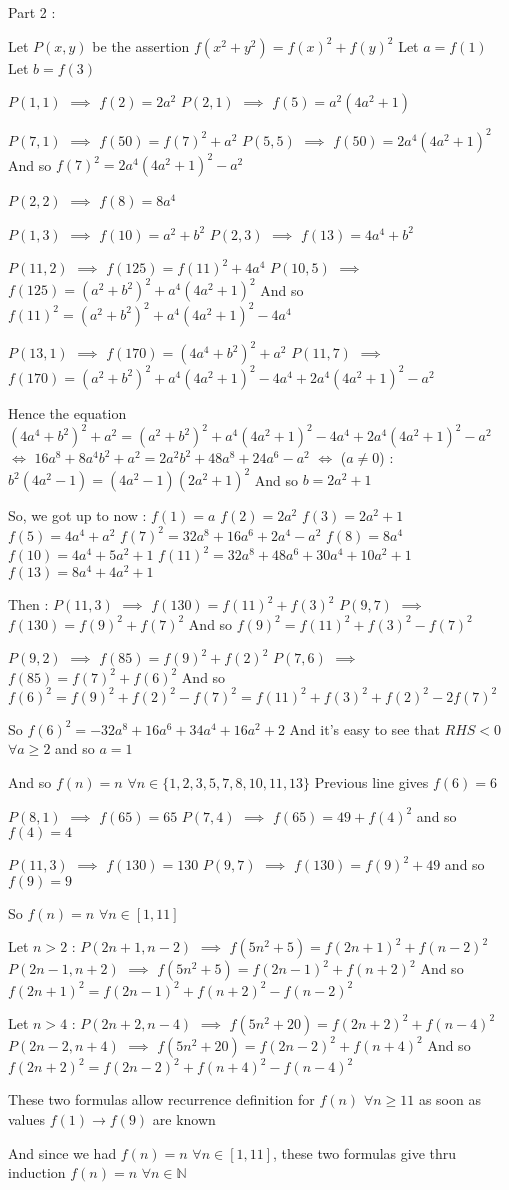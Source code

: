 \begin{solution}
	Part 2 :

Let $P(x,y)$ be the assertion $f(x^2+y^2)=f(x)^2+f(y)^2$
Let $a=f(1)$
Let $b=f(3)$

$P(1,1)$ $\implies$ $f(2)=2a^2$
$P(2,1)$ $\implies$ $f(5)=a^2(4a^2+1)$

$P(7,1)$ $\implies$ $f(50)=f(7)^2+a^2$
$P(5,5)$ $\implies$ $f(50)=2a^4(4a^2+1)^2$
And so $f(7)^2=2a^4(4a^2+1)^2-a^2$

$P(2,2)$ $\implies$ $f(8)=8a^4$

$P(1,3)$ $\implies$ $f(10)=a^2+b^2$
$P(2,3)$ $\implies$ $f(13)=4a^4+b^2$

$P(11,2)$ $\implies$ $f(125)=f(11)^2+4a^4$
$P(10,5)$ $\implies$ $f(125)=(a^2+b^2)^2+a^4(4a^2+1)^2$
And so $f(11)^2=(a^2+b^2)^2+a^4(4a^2+1)^2-4a^4$

$P(13,1)$ $\implies$ $f(170)=(4a^4+b^2)^2+a^2$
$P(11,7)$ $\implies$ $f(170)=(a^2+b^2)^2+a^4(4a^2+1)^2-4a^4+2a^4(4a^2+1)^2-a^2$

Hence the equation $(4a^4+b^2)^2+a^2=(a^2+b^2)^2+a^4(4a^2+1)^2-4a^4+2a^4(4a^2+1)^2-a^2$
$\iff$ $16a^8+8a^4b^2+a^2=2a^2b^2+48a^8+24a^6-a^2$
$\iff$ ($a\ne 0$) : $b^2(4a^2-1)=(4a^2-1)(2a^2+1)^2$
And so $b=2a^2+1$

So, we got up to now :
$f(1)=a$
$f(2)=2a^2$
$f(3)=2a^2+1$
$f(5)=4a^4+a^2$
$f(7)^2=32a^8+16a^6+2a^4-a^2$
$f(8)=8a^4$
$f(10)=4a^4+5a^2+1$
$f(11)^2=32a^8+48a^6+30a^4+10a^2+1$
$f(13)=8a^4+4a^2+1$

Then :
$P(11,3)$ $\implies$ $f(130)=f(11)^2+f(3)^2$
$P(9,7)$ $\implies$ $f(130)=f(9)^2+f(7)^2$
And so $f(9)^2=f(11)^2+f(3)^2-f(7)^2$

$P(9,2)$ $\implies$ $f(85)=f(9)^2+f(2)^2$
$P(7,6)$ $\implies$ $f(85)=f(7)^2+f(6)^2$
And so $f(6)^2=f(9)^2+f(2)^2-f(7)^2=f(11)^2+f(3)^2+f(2)^2-2f(7)^2$

So $f(6)^2=-32a^8+16a^6+34a^4+16a^2+2$
And it's easy to see that $RHS<0$ $\forall a\ge 2$ and so $a=1$

And so $f(n)=n$ $\forall n\in\{1,2,3,5,7,8,10,11,13\}$
Previous line gives $f(6)=6$

$P(8,1)$ $\implies$ $f(65)=65$
$P(7,4)$ $\implies$ $f(65)=49+f(4)^2$ and so $f(4)=4$

$P(11,3)$ $\implies$ $f(130)=130$
$P(9,7)$ $\implies$ $f(130)=f(9)^2+49$ and so $f(9)=9$

So $f(n)=n$ $\forall n\in[1,11]$

Let $n>2$ :
$P(2n+1,n-2)$ $\implies$ $f(5n^2+5)=f(2n+1)^2+f(n-2)^2$
$P(2n-1,n+2)$ $\implies$ $f(5n^2+5)=f(2n-1)^2+f(n+2)^2$
And so $f(2n+1)^2=f(2n-1)^2+f(n+2)^2-f(n-2)^2$

Let $n>4$ :
$P(2n+2,n-4)$ $\implies$ $f(5n^2+20)=f(2n+2)^2+f(n-4)^2$
$P(2n-2,n+4)$ $\implies$ $f(5n^2+20)=f(2n-2)^2+f(n+4)^2$
And so $f(2n+2)^2=f(2n-2)^2+f(n+4)^2-f(n-4)^2$

These two formulas allow recurrence definition for $f(n)$ $\forall n\ge 11$ as soon as values $f(1)\to f(9)$ are known

And since we had $f(n)=n$ $\forall n\in[1,11]$, these two formulas give thru induction $\boxed{f(n)=n}$ $\forall n\in\mathbb N$
\end{solution}
